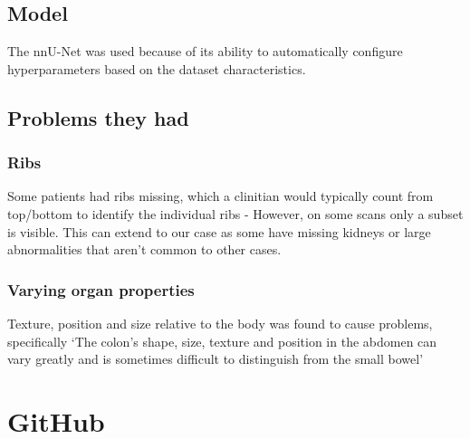 \documentclass[11pt]{article}
\begin{document}
\subsection{Model}

The nnU-Net was used because of its ability to automatically configure hyperparameters based on the dataset characteristics.

\subsection{Problems they had}

\subsubsection{Ribs}

Some patients had ribs missing, which a clinitian would typically count from top/bottom to identify the individual ribs - However, on some scans only a subset is visible. This can extend to our case as some have missing kidneys or large abnormalities that aren't common to other cases.

\subsubsection{Varying organ properties}

Texture, position and size relative to the body was found to cause problems, specifically `The colon's shape, size, texture and position in the abdomen can vary greatly and is sometimes difficult to distinguish from the small bowel'

\section{GitHub}



\printbibliography
\end{document}
